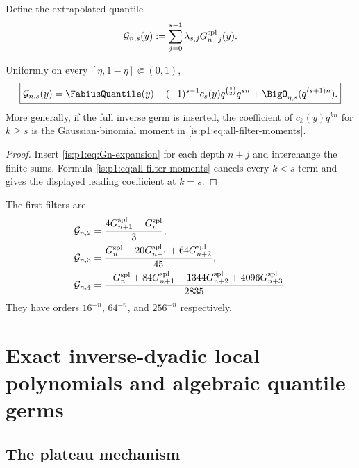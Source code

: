 Define the extrapolated quantile
\begin{equation}
 \mathcal G_{n,s}(y):=\sum_{j=0}^{s-1}\lambda_{s,j}
 G_{n+j}^{\mathrm{spl}}(y).
 \label{is:p1:eq:G-richardson}
\end{equation}

\begin{theorem}
\label{is:p1:thm:quantile-richardson}
Uniformly on every $[\eta,1-\eta]\Subset(0,1)$,
\begin{equation}
 \boxed{
 \mathcal G_{n,s}(y)=\FabiusQuantile(y)
 +(-1)^{s-1}c_s(y)q^{\binom s2}q^{sn}
 +\BigO_{\eta,s}(q^{(s+1)n}).}
 \label{is:p1:eq:quantile-richardson}
\end{equation}
More generally, if the full inverse germ is inserted, the coefficient of $c_k(y)q^{kn}$
for $k\ge s$ is the Gaussian-binomial moment in \eqref{is:p1:eq:all-filter-moments}.
\end{theorem}

\begin{proof}
Insert \eqref{is:p1:eq:Gn-expansion} for each depth $n+j$ and interchange the finite
sums.  Formula \eqref{is:p1:eq:all-filter-moments} cancels every $k<s$ term and gives
the displayed leading coefficient at $k=s$.
\end{proof}

The first filters are
\begin{align}
 \mathcal G_{n,2}&=\frac{4G_{n+1}^{\mathrm{spl}}-G_{n}^{\mathrm{spl}}}{3},
 \label{is:p1:eq:R2-filter}\\
 \mathcal G_{n,3}&=\frac{G_{n}^{\mathrm{spl}}-20G_{n+1}^{\mathrm{spl}}
 +64G_{n+2}^{\mathrm{spl}}}{45},
 \label{is:p1:eq:R3-filter}\\
 \mathcal G_{n,4}&=
 \frac{-G_{n}^{\mathrm{spl}}+84G_{n+1}^{\mathrm{spl}}-1344G_{n+2}^{\mathrm{spl}}
 +4096G_{n+3}^{\mathrm{spl}}}{2835}.
 \label{is:p1:eq:R4-filter}
\end{align}
They have orders $16^{-n}$, $64^{-n}$, and $256^{-n}$ respectively.

\section{Exact inverse-dyadic local polynomials and algebraic quantile germs}
\label{is:p1:sec:exact-local}

\subsection{The plateau mechanism}

